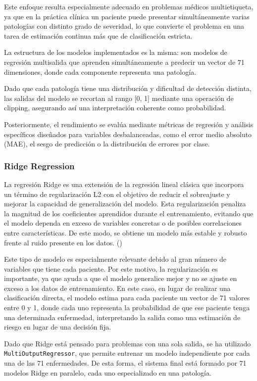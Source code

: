 \documentclass[12pt,a4paper,twoside]{book}
\begin{document}
Este enfoque resulta especialmente adecuado en problemas médicos multietiqueta, ya que en la práctica clínica un paciente puede presentar simultáneamente varias patologías con distinto grado de severidad, lo que convierte el problema en una tarea de estimación continua más que de clasificación estricta.

La estructura de los modelos implementados es la misma: son modelos de regresión multisalida que aprenden simultáneamente a predecir un vector de 71 dimensiones, donde cada componente representa una patología.

Dado que cada patología tiene una distribución y dificultad de detección distinta, las salidas del modelo se recortan al rango [0, 1] mediante una operación de clipping, asegurando así una interpretación coherente como probabilidad.

Posteriormente, el rendimiento se evalúa mediante métricas de regresión y análisis específicos diseñados para variables desbalanceadas, como el error medio absoluto (MAE), el sesgo de predicción o la distribución de errores por clase.

\subsubsection*{Ridge Regression}

La regresión Ridge es una extensión de la regresión lineal clásica que incorpora un término de regularización L2 con el objetivo de reducir el sobreajuste y mejorar la capacidad de generalización del modelo.
Esta regularización penaliza la magnitud de los coeficientes aprendidos durante el entrenamiento, evitando que el modelo dependa en exceso de variables concretas o de posibles correlaciones entre características. De este modo, se obtiene un modelo más estable y robusto frente al ruido presente en los datos. (\cite{ibm_ridge_regression})

Este tipo de modelo es especialmente relevante debido al gran número de variables que tiene cada paciente.
Por este motivo, la regularización es importante, ya que ayuda a que el modelo generalice mejor y no se ajuste en exceso a los datos de entrenamiento. 
En este caso, en lugar de realizar una clasificación directa, el modelo estima para cada paciente un vector de 71 valores entre 0 y 1, donde cada uno representa la probabilidad de que ese paciente tenga una determinada enfermedad, interpretando la salida como una estimación de riesgo en lugar de una decisión fija.

Dado que Ridge está pensado para problemas con una sola salida, se ha utilizado \texttt{MultiOutputRegressor}, que permite entrenar un modelo independiente por cada una de las 71 enfermedades. De esta forma, el sistema final está formado por 71 modelos Ridge en paralelo, cada uno especializado en una patología.
\end{document}
